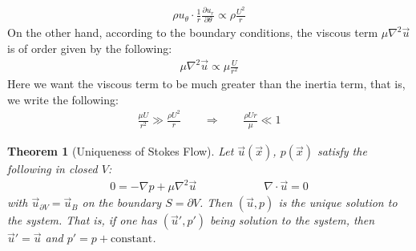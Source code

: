 \documentclass[11pt]{book}
\theoremstyle{break}
\theoremstyle{break}
\newtheorem{thm}{Theorem}[section]
\newcommand{\pd}{\partial}
\begin{document}
\begin{align*}
\rho u_{\theta} \cdot \frac{1}{r}\frac{\pd u_r}{\pd \theta} \propto \rho \frac{U^2}{r}
\end{align*}
On the other hand, according to the boundary conditions, the viscous term $\mu \nabla^2 \vec{u}$ is of order given by the following:
\begin{align*}
\mu \nabla^2 \vec{u}\propto \mu \frac{U}{r^2}
\end{align*}
Here we want the viscous term to be much greater than the inertia term, that is, we write the following:
\begin{align*}
\frac{\mu U}{r^2} \gg \frac{\rho U^2}{r} \qquad \Rightarrow \qquad \frac{\rho Ur}{\mu} \ll 1
\end{align*}
\newpage
\begin{thm}[Uniqueness of Stokes Flow]
Let $\vec{u}(\vec{x})$, $p(\vec{x})$ satisfy the following in closed $V$:
\begin{align*}
0 = -\nabla p + \mu \nabla^2 \vec{u}\qquad\qquad\qquad \nabla \cdot \vec{u} = 0
\end{align*}
with $\vec{u}_{\pd V} = \vec{u}_B$ on the boundary $S = \partial V$. Then $(\vec{u},p)$ is the unique solution to the system. That is, if one has $(\vec{u}', p')$ being solution to the system, then $\vec{u}' = \vec{u}$ and $p' = p+\text{constant}$.
\end{thm}
\end{document}
